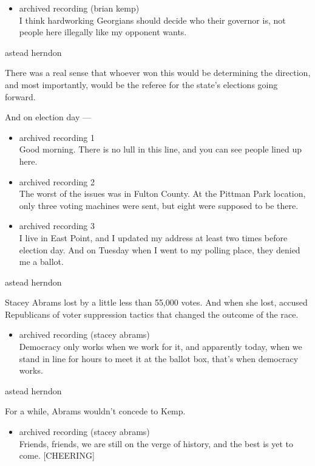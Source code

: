 \begin{itemize}
\tightlist
\item
  archived recording (brian kemp)\\
  I think hardworking Georgians should decide who their governor is, not
  people here illegally like my opponent wants.
\end{itemize}

astead herndon

There was a real sense that whoever won this would be determining the
direction, and most importantly, would be the referee for the state's
elections going forward.

And on election day ---

\begin{itemize}
\item
  archived recording 1\\
  Good morning. There is no lull in this line, and you can see people
  lined up here.
\item
  archived recording 2\\
  The worst of the issues was in Fulton County. At the Pittman Park
  location, only three voting machines were sent, but eight were
  supposed to be there.
\item
  archived recording 3\\
  I live in East Point, and I updated my address at least two times
  before election day. And on Tuesday when I went to my polling place,
  they denied me a ballot.
\end{itemize}

astead herndon

Stacey Abrams lost by a little less than 55,000 votes. And when she
lost, accused Republicans of voter suppression tactics that changed the
outcome of the race.

\begin{itemize}
\tightlist
\item
  archived recording (stacey abrams)\\
  Democracy only works when we work for it, and apparently today, when
  we stand in line for hours to meet it at the ballot box, that's when
  democracy works.
\end{itemize}

astead herndon

For a while, Abrams wouldn't concede to Kemp.

\begin{itemize}
\tightlist
\item
  archived recording (stacey abrams)\\
  Friends, friends, we are still on the verge of history, and the best
  is yet to come. {[}CHEERING{]}
\end{itemize}

